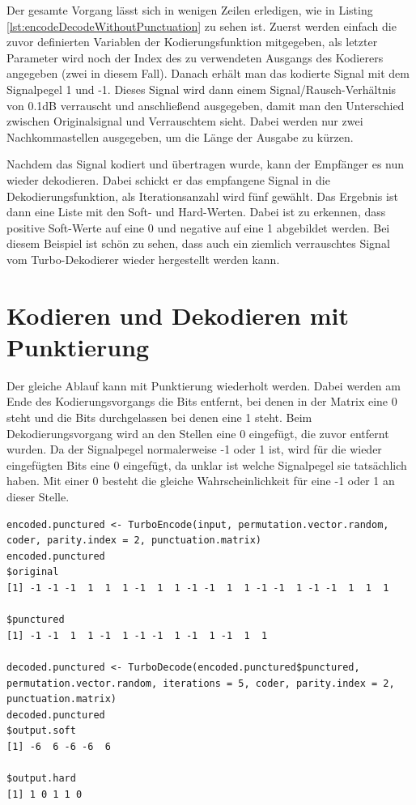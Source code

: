 Der gesamte Vorgang lässt sich in wenigen Zeilen erledigen, wie in Listing \ref{lst:encodeDecodeWithoutPunctuation} zu sehen ist. Zuerst werden einfach die zuvor definierten Variablen der Kodierungsfunktion mitgegeben, als letzter Parameter wird noch der Index des zu verwendeten Ausgangs des Kodierers angegeben (zwei in diesem Fall). Danach erhält man das kodierte Signal mit dem Signalpegel 1 und -1. Dieses Signal wird dann einem Signal/Rausch-Verhältnis von 0.1dB  verrauscht und anschließend ausgegeben, damit man den Unterschied zwischen Originalsignal und Verrauschtem sieht. Dabei werden nur zwei Nachkommastellen ausgegeben, um die Länge der Ausgabe zu kürzen. 

Nachdem das Signal kodiert und übertragen wurde, kann der Empfänger es nun wieder dekodieren. Dabei schickt er das empfangene Signal in die Dekodierungsfunktion, als Iterationsanzahl wird fünf gewählt. Das Ergebnis ist dann eine Liste mit den Soft- und Hard-Werten. Dabei ist zu erkennen, dass positive Soft-Werte auf eine 0 und negative auf eine 1 abgebildet werden. Bei diesem Beispiel ist schön zu sehen, dass auch ein ziemlich verrauschtes Signal vom Turbo-Dekodierer wieder hergestellt werden kann.
\section{Kodieren und Dekodieren mit Punktierung}
\label{sec:example_withPunctuation}

Der gleiche Ablauf kann mit Punktierung wiederholt werden. Dabei werden am Ende des Kodierungsvorgangs die Bits entfernt, bei denen in der Matrix eine 0 steht und die Bits durchgelassen bei denen eine 1 steht. Beim Dekodierungsvorgang wird an den Stellen eine 0 eingefügt, die zuvor entfernt wurden. Da der Signalpegel normalerweise -1 oder 1 ist, wird für die wieder eingefügten Bits eine 0 eingefügt, da unklar ist welche Signalpegel sie tatsächlich haben. Mit einer 0 besteht die gleiche Wahrscheinlichkeit für eine -1 oder 1 an dieser Stelle.

\begin{lstlisting}[caption=Kodierung und Dekodierung mit Punktierung, label={lst:encodeDecodeWithPunctuation}, float=!ht]
encoded.punctured <- TurboEncode(input, permutation.vector.random, coder, parity.index = 2, punctuation.matrix)
encoded.punctured
$original
[1] -1 -1 -1  1  1  1 -1  1  1 -1 -1  1  1 -1 -1  1 -1 -1  1  1  1

$punctured
[1] -1 -1  1  1 -1  1 -1 -1  1 -1  1 -1  1  1

decoded.punctured <- TurboDecode(encoded.punctured$punctured, permutation.vector.random, iterations = 5, coder, parity.index = 2, punctuation.matrix)
decoded.punctured
$output.soft
[1] -6  6 -6 -6  6

$output.hard
[1] 1 0 1 1 0
\end{lstlisting}

